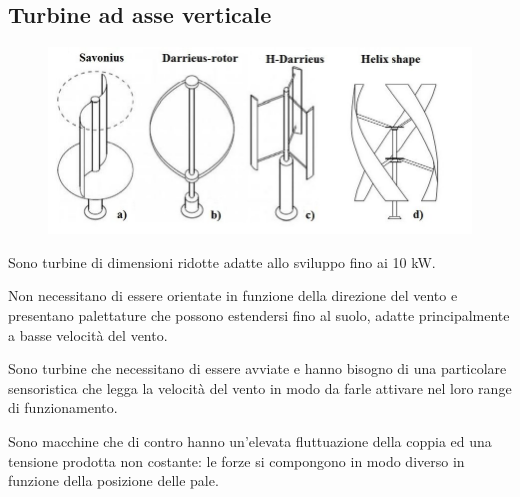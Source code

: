 \documentclass[a4paper, 15pt]{article}
\begin{document}
\subsection{Turbine ad asse verticale}
\begin{adjustwidth}{2in}{}
\begin{figure}[H]
	\centering
	\includegraphics[width=0.5\linewidth]{immagini/eoliche6}
	\label{fig:eoliche6}
\end{figure}
	Sono turbine di dimensioni ridotte adatte allo sviluppo fino ai 10 kW. 
	
	Non necessitano di essere orientate in funzione della direzione del vento e presentano palettature che possono estendersi fino al suolo, adatte principalmente a basse velocità del vento. \newline 
	
	Sono turbine che necessitano di essere avviate e hanno bisogno di una particolare sensoristica che legga la velocità del vento in modo da farle attivare nel loro range di funzionamento. 
	
	Sono macchine che di contro hanno un'elevata fluttuazione della coppia ed una tensione prodotta non costante: le forze si compongono in modo diverso in funzione della posizione delle pale.  
\end{adjustwidth}
\end{document}
